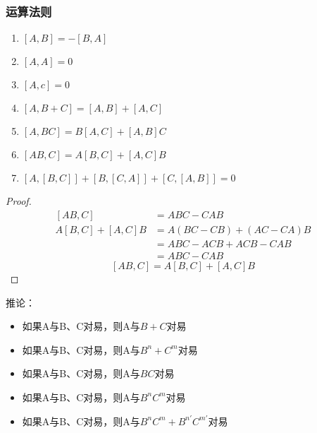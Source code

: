 \begin{frame} 
    \frametitle{运算法则}
    \begin{enumerate}
        \item  $[A,B]=-[B,A]$
        \item  $[A,A]=0$
        \item  $[A,c]=0$
        \item  $[A,B+C]=[A,B]+[A,C]$
        \item  $[A,BC]=B[A,C]+[A,B]C$
        \item  $[AB,C]=A[B,C]+[A,C]B$
        \item  $[A,[B,C]] + [B,[C,A]] + [C,[A,B]] =0$
    \end{enumerate}
\end{frame} 
\begin{frame}
    \begin{proof}{}   
        \begin{equation*}
            \begin{split} 
            [AB,C]&=ABC-CAB \\
            A[B,C]+[A,C]B&=A(BC-CB)+(AC-CA)B\\
            &=ABC-ACB+ACB-CAB\\
            &=ABC-CAB
            \end{split}  
        \end{equation*}  
        $$ [AB,C]=A[B,C]+[A,C]B $$
    \end{proof}
\end{frame} 

\begin{frame} 
    \begin{tcolorbox2}{推论：}
        \begin{itemize}
            \item 如果A与B、C对易，则A与$B+C$对易
            \item 如果A与B、C对易，则A与$B^n+C^m$对易
            \item 如果A与B、C对易，则A与$BC$对易
            \item 如果A与B、C对易，则A与$B^nC^m$对易
            \item 如果A与B、C对易，则A与$B^nC^m+B^{n'}C^{m'}$对易
        \end{itemize}
    \end{tcolorbox2}
\end{frame} 

